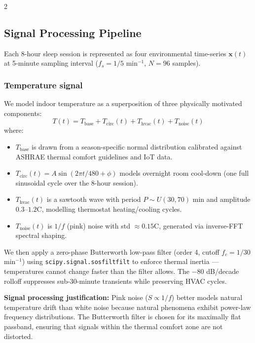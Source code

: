 \documentclass[11pt,a4paper]{article}
\begin{document}
\begin{multicols}{2}
\subsection{Signal Processing Pipeline}
\label{sec:sp}

Each 8-hour sleep session is represented as four environmental time-series
$\mathbf{x}(t)$ at 5-minute sampling interval ($f_s = 1/5$ min$^{-1}$,
$N = 96$ samples).

\subsubsection{Temperature signal}

We model indoor temperature as a superposition of three physically motivated
components:
\begin{equation}
  T(t) = T_{\text{base}} + T_{\text{circ}}(t) + T_{\text{hvac}}(t) + T_{\text{noise}}(t)
\end{equation}
where:
\begin{itemize}\setlength\itemsep{0pt}
  \item $T_{\text{base}}$ is drawn from a season-specific normal distribution
        calibrated against ASHRAE thermal comfort guidelines and IoT data.
  \item $T_{\text{circ}}(t) = A \sin(2\pi t / 480 + \phi)$ models overnight
        room cool-down (one full sinusoidal cycle over the 8-hour session).
  \item $T_{\text{hvac}}(t)$ is a sawtooth wave with period $P \sim U(30, 70)$
        min and amplitude $0.3$–$1.2$\textdegree{}C, modelling thermostat
        heating/cooling cycles.
  \item $T_{\text{noise}}(t)$ is $1/f$ (pink) noise with std $\approx 0.15$\textdegree{}C,
        generated via inverse-FFT spectral shaping.
\end{itemize}

We then apply a zero-phase Butterworth low-pass filter (order 4, cutoff
$f_c = 1/30$ min$^{-1}$) using \texttt{scipy.signal.sosfiltfilt} to enforce
thermal inertia — temperatures cannot change faster than the filter allows.
The −80 dB/decade rolloff suppresses sub-30-minute transients while preserving
HVAC cycles.

\textbf{Signal processing justification:}
Pink noise ($S \propto 1/f$) better models natural temperature drift than white
noise because natural phenomena exhibit power-law frequency distributions.
The Butterworth filter is chosen for its maximally flat passband, ensuring that
signals within the thermal comfort zone are not distorted.


\end{multicols}
\end{document}
